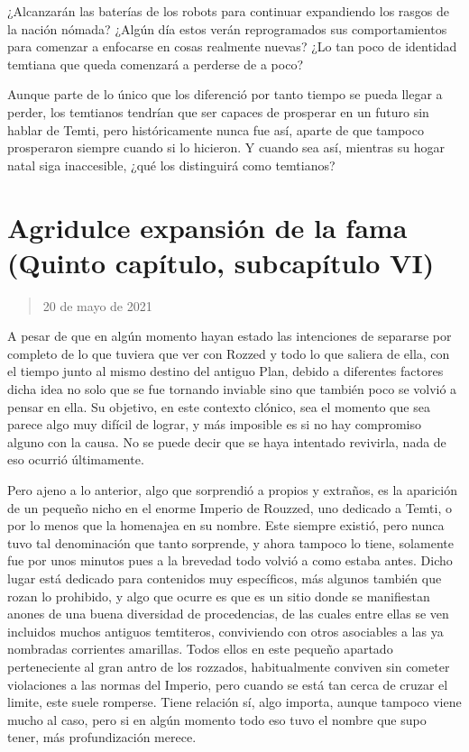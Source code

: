 \documentclass[
  spanish,
]{book}
\begin{document}
¿Alcanzarán las baterías de los robots para continuar expandiendo los rasgos de la nación nómada? ¿Algún día estos verán reprogramados sus comportamientos para comenzar a enfocarse en cosas realmente nuevas? ¿Lo tan poco de identidad temtiana que queda comenzará a perderse de a poco?

Aunque parte de lo único que los diferenció por tanto tiempo se pueda llegar a perder, los temtianos tendrían que ser capaces de prosperar en un futuro sin hablar de Temti, pero históricamente nunca fue así, aparte de que tampoco prosperaron siempre cuando si lo hicieron. Y cuando sea así, mientras su hogar natal siga inaccesible, ¿qué los distinguirá como temtianos?

\hypertarget{agridulce-expansiuxf3n-de-la-fama-quinto-capuxedtulo-subcapuxedtulo-vi}{%
\section{Agridulce expansión de la fama (Quinto capítulo, subcapítulo VI)}\label{agridulce-expansiuxf3n-de-la-fama-quinto-capuxedtulo-subcapuxedtulo-vi}}

\begin{quote}
20 de mayo de 2021
\end{quote}

A pesar de que en algún momento hayan estado las intenciones de separarse por completo de lo que tuviera que ver con Rozzed y todo lo que saliera de ella, con el tiempo junto al mismo destino del antiguo Plan, debido a diferentes factores dicha idea no solo que se fue tornando inviable sino que también poco se volvió a pensar en ella. Su objetivo, en este contexto clónico, sea el momento que sea parece algo muy difícil de lograr, y más imposible es si no hay compromiso alguno con la causa. No se puede decir que se haya intentado revivirla, nada de eso ocurrió últimamente.

Pero ajeno a lo anterior, algo que sorprendió a propios y extraños, es la aparición de un pequeño nicho en el enorme Imperio de Rouzzed, uno dedicado a Temti, o por lo menos que la homenajea en su nombre. Este siempre existió, pero nunca tuvo tal denominación que tanto sorprende, y ahora tampoco lo tiene, solamente fue por unos minutos pues a la brevedad todo volvió a como estaba antes. Dicho lugar está dedicado para contenidos muy específicos, más algunos también que rozan lo prohibido, y algo que ocurre es que es un sitio donde se manifiestan anones de una buena diversidad de procedencias, de las cuales entre ellas se ven incluidos muchos antiguos temtiteros, conviviendo con otros asociables a las ya nombradas corrientes amarillas. Todos ellos en este pequeño apartado perteneciente al gran antro de los rozzados, habitualmente conviven sin cometer violaciones a las normas del Imperio, pero cuando se está tan cerca de cruzar el limite, este suele romperse. Tiene relación sí, algo importa, aunque tampoco viene mucho al caso, pero si en algún momento todo eso tuvo el nombre que supo tener, más profundización merece.
\end{document}
